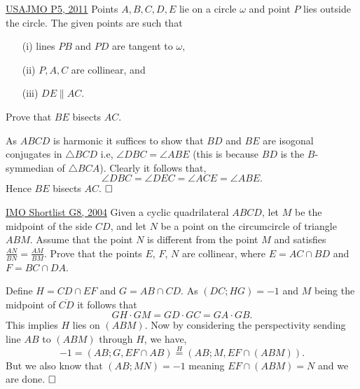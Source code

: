 \begin{problem}{12}{\href{https://artofproblemsolving.com/community/q1h404355p35105708}{USAJMO P5, 2011}} 
	Points $A,B,C,D,E$ lie on a circle $\omega$ and point $P$ lies outside the circle. The given points are such that 
	\begin{itemize}
		\item [(i)] lines $PB$ and $PD$ are tangent to $\omega$,
		\item [(ii)] $P, A, C$ are collinear, and 
		\item[(iii)] $DE \parallel AC$.
	\end{itemize}
	Prove that $BE$ bisects $AC$.
	\begin{solution} As $ABCD$ is harmonic it suffices to show that $BD$ and $BE$ are isogonal conjugates in $\triangle BCD$ i.e, $\angle DBC=\angle ABE$ (this is because $BD$ is the $B$-symmedian of $\triangle BCA$). Clearly it follows that,
$$\angle DBC=\angle DEC=\angle ACE=\angle ABE.$$Hence $BE$ bisects $AC$. $\qedwhite$
	\end{solution}
\end{problem}

\begin{problem}{13}{\href{https://artofproblemsolving.com/community/c6h39093p243438}{IMO Shortlist G8, 2004}} 
	Given a cyclic quadrilateral $ABCD$, let $M$ be the midpoint of the side $CD$, and let $N$ be a point on the circumcircle of triangle $ABM$. Assume that the point $N$ is different from the point $M$ and satisfies $\frac{AN}{BN}=\frac{AM}{BM}$. Prove that the points $E$, $F$, $N$ are collinear, where $E=AC\cap BD$ and $F=BC\cap DA$.
	\begin{solution} Define $H=CD\cap EF$ and $G=AB\cap CD$. As $(DC; HG)=-1$ and $M$ being the midpoint of $\overline{CD}$ it follows that 
	$$GH\cdot GM=GD\cdot GC=GA\cdot GB.$$
	This implies $H$ lies on $(ABM)$. Now by considering the perspectivity sending line $AB$ to $(ABM)$ through $H$, we have,
	$$-1=(AB; G, EF\cap AB)\overset{H}{=}(AB; M, EF\cap (ABM)).$$
	But we also know that $(AB; MN)=-1$ meaning $EF\cap (ABM)=N$ and we are done. $\qedwhite$
	\end{solution}
\end{problem}

